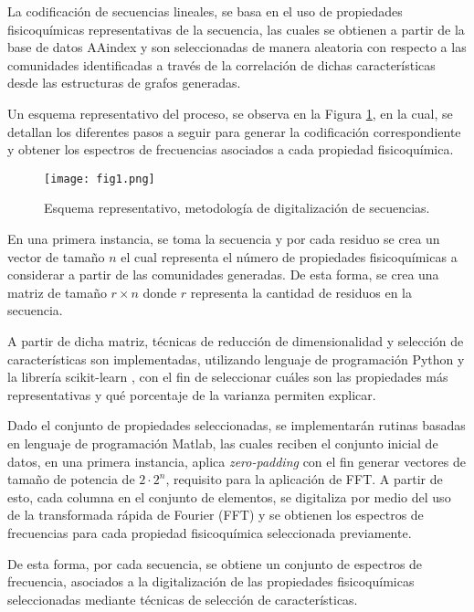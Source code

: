 La codificación de secuencias lineales, se basa en el uso de propiedades fisicoquímicas representativas de la secuencia, las cuales se obtienen a partir de la base de datos AAindex\cite{Kawashima2000} y son seleccionadas de manera aleatoria con respecto a las comunidades identificadas a través de la correlación de dichas características desde las estructuras de grafos generadas.

Un esquema representativo del proceso, se observa en la Figura \ref{cap3:fig1}, en la cual, se detallan los diferentes pasos a seguir para generar la codificación correspondiente y obtener los espectros de frecuencias asociados a cada propiedad fisicoquímica.

\begin{figure}[!h]
	
	\centering
	\texttt{[image: fig1.png]}
	\caption{Esquema representativo, metodología de digitalización de secuencias.}
	\label{cap3:fig1}
\end{figure}

En una primera instancia, se toma la secuencia y por cada residuo se crea un vector de tamaño $n$ el cual representa el número de propiedades fisicoquímicas a considerar a partir de las comunidades generadas. De esta forma, se crea una matriz de tamaño $r \times n$ donde $r$ representa la cantidad de residuos en la secuencia.


A partir de dicha matriz, técnicas de reducción de dimensionalidad y selección de características son implementadas, utilizando lenguaje de programación Python y la librería scikit-learn \cite{pedregosa2011scikit}, con el fin de seleccionar cuáles son las propiedades más representativas y qué porcentaje de la varianza permiten explicar.

Dado el conjunto de propiedades seleccionadas, se implementarán rutinas basadas en lenguaje de programación Matlab, las cuales reciben el conjunto inicial de datos, en una primera instancia, aplica \textit{zero-padding} con el fin generar vectores de tamaño de potencia de $2\cdot2^n$, requisito para la aplicación de FFT. A partir de esto, cada columna en el conjunto de elementos, se digitaliza por medio del uso de la transformada rápida de Fourier (FFT) y se obtienen los espectros de frecuencias para cada propiedad fisicoquímica seleccionada previamente.

De esta forma, por cada secuencia, se obtiene un conjunto de espectros de frecuencia, asociados a la digitalización de las propiedades fisicoquímicas seleccionadas mediante técnicas de selección de características.

